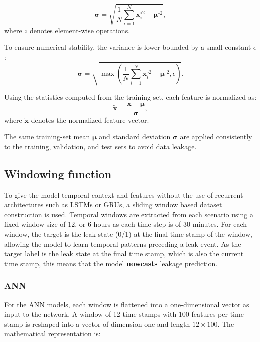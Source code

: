 \documentclass[final,5p,times,twocolumn,authoryear]{elsarticle}
\begin{document}
\begin{equation}
\boldsymbol{\sigma} =
\sqrt{
\frac{1}{N} \sum_{i=1}^{N} \mathbf{x}_i^{\circ 2}
- \boldsymbol{\mu}^{\circ 2}
},
\end{equation}
where $\circ$ denotes element-wise operations.

To ensure numerical stability, the variance is lower bounded by a small constant
$\epsilon$:
\begin{equation}
\boldsymbol{\sigma} =
\sqrt{
\max\left(
\frac{1}{N} \sum_{i=1}^{N} \mathbf{x}_i^{\circ 2}
- \boldsymbol{\mu}^{\circ 2},
\epsilon
\right)
}.
\end{equation}

Using the statistics computed from the training set, each feature is normalized
as:
\begin{equation}
\tilde{\mathbf{x}} =
\frac{\mathbf{x} - \boldsymbol{\mu}}{\boldsymbol{\sigma}},
\end{equation}
where $\tilde{\mathbf{x}}$ denotes the normalized feature vector.

The same training-set mean $\boldsymbol{\mu}$ and standard deviation
$\boldsymbol{\sigma}$ are applied consistently to the training, validation, and
test sets to avoid data leakage.

\subsection{Windowing function}

To give the model temporal context and features without the use of recurrent architectures such as LSTMs or GRUs, a sliding window based dataset construction is used. Temporal windows are extracted from each scenario using a fixed window size of $12$, or 6 hours as each time-step is of 30 minutes. For each window, the target is the leak state (0/1) at the final time stamp of the window, allowing the model to learn temporal patterns preceding a leak event. As the target label is the leak state at the final time stamp, which is also the current time stamp, this means that the model \textbf{nowcasts} leakage prediction. 

\subsubsection{ANN}

For the ANN models, each window is flattened into a one-dimensional vector as input to the network. A window of 12 time stamps with 100 features per time stamp is reshaped into a vector of dimension one and length $12\times100$. The mathematical representation is:
\end{document}
